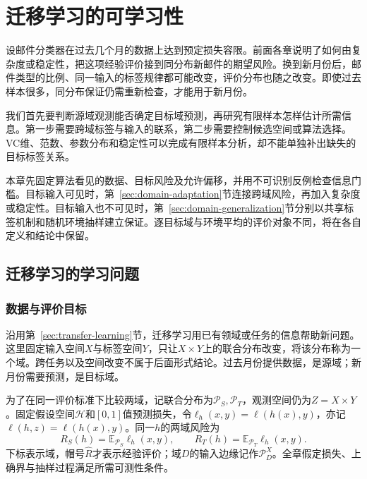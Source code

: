 \chapter{迁移学习的可学习性}
\label{chap:transfer-learning-theory}

设邮件分类器在过去几个月的数据上达到预定损失容限。前面各章说明了如何由复杂度或稳定性，把这项经验评价接到同分布新邮件的期望风险。换到新月份后，邮件类型的比例、同一输入的标签规律都可能改变，评价分布也随之改变。即使过去样本很多，同分布保证仍需重新检查，才能用于新月份。

我们首先要判断源域观测能否确定目标域预测，再研究有限样本怎样估计所需信息。第一步需要跨域标签与输入的联系，第二步需要控制候选空间或算法选择。VC维、范数、参数分布和稳定性可以完成有限样本分析，却不能单独补出缺失的目标标签关系。

本章先固定算法看见的数据、目标风险及允许偏移，并用不可识别反例检查信息门槛。目标输入可见时，第~\ref{sec:domain-adaptation}节连接跨域风险，再加入复杂度或稳定性。目标输入也不可见时，第~\ref{sec:domain-generalization}节分别以共享标签机制和随机环境抽样建立保证。逐目标域与环境平均的评价对象不同，将在各自定义和结论中保留。

\section{迁移学习的学习问题}
\label{sec:transfer-learning-setting}

\subsection{数据与评价目标}
\label{sec:adaptation-generalization-settings}

沿用第~\ref{sec:transfer-learning}节，迁移学习用已有领域或任务的信息帮助新问题。这里固定输入空间$X$与标签空间$Y$，只让$X\times Y$上的联合分布改变，将该分布称为一个域。跨任务以及空间改变不属于后面形式结论。过去月份提供数据，是源域；新月份需要预测，是目标域。

为了在同一评价标准下比较两域，记联合分布为$\mathcal P_S,\mathcal P_T$，观测空间仍为$Z=X\times Y$。固定假设空间$\mathcal H$和$[0,1]$值预测损失，令$\ell_h(x,y)=\ell(h(x),y)$，亦记$\ell(h,z)=\ell(h(x),y)$。同一$h$的两域风险为
\begin{equation}
 R_S(h)=\mathbb E_{\mathcal P_S}\ell_h(x,y),\qquad
 R_T(h)=\mathbb E_{\mathcal P_T}\ell_h(x,y).
 \label{eq:transfer-population-risks}
\end{equation}
下标表示域，帽号$\hat R$才表示经验评价；域$D$的输入边缘记作$\mathcal P_D^X$。全章假定损失、上确界与抽样过程满足所需可测性条件。

